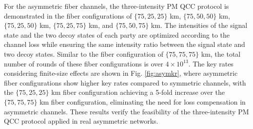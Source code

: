\documentclass[aps,twocolumn,superscriptaddress,showpacs,nofootinbib]{revtex4-2}
\begin{document}
For the asymmetric fiber channels, the three-intensity PM QCC protocol is demonstrated in the fiber configurations of $\{75, 25, 25\}$ km, $\{75, 50, 50\}$ km, $\{75, 25, 50\}$ km, $\{75, 25, 75\}$ km,  and $\{75, 50, 75\}$ km. The intensities of the signal state and the two decoy states of each party are optimized according to the channel loss while ensuring the same intensity ratio between the signal state and two decoy states. Similar to the fiber configuration of $\{75, 75, 75\}$ km, the total number of rounds of these fiber configurations is over $4\times10^{13}$. The key rates considering finite-size effects are shown in Fig. \ref{fig:asymkr}, where asymmetric fiber configurations show higher key rates compared to symmetric channels, with the $\{75,25,25\}$ km fiber configuration achieving a 5-fold increase over the $\{75,75,75\}$ km fiber configuration, eliminating the need for loss compensation in asymmetric channels. These results verify the feasibility of the three-intensity PM QCC protocol applied in real asymmetric networks.

\begin{table}[bpth!]

	\centering
	\caption{ Experimental parameters and results for symmetric and asymmetric channels. The detector dark count rate $p_d$ is about $2.4\times10^{-8}/\text{pulse}$. The total detection efficiency $\eta_d$ considering the insertion loss, the efficiency of SNSPD, the non-overlapping of the coherent pulse with the detection time window is about $60.5\%$. $L$ is the length of fiber channel configuration $\{d_A, d_B, d_C\}$. $R_1$ is the key rate considering the finite-size effects.}
\label{table:exppr}
\end{table}
\end{document}
